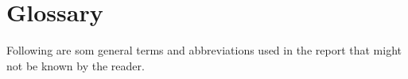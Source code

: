 \chapter{Glossary}
Following are som general terms and abbreviations used in the report that might not be known by the reader.

